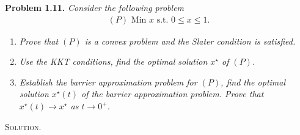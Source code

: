 \documentclass[a4paper]{article}
\numberwithin{equation}{section}
\begin{document}
\textbf{Problem 1.11.} \textit{Consider the following problem}
\begin{align}
\left( P \right) \mbox{ Min } x\mbox{ s.t. } 0 \le x \le 1.
\end{align}
\begin{enumerate}
\item \textit{Prove that  $\left(P\right)$ is a convex problem and the Slater condition is satisfied.}
\item \textit{Use the KKT conditions, find the optimal solution $x^\star$ of $\left(P\right)$.}
\item \textit{Establish the barrier approximation problem for $\left(P\right)$, find the optimal solution $x^\star \left(t\right)$ of the barrier approximation problem. Prove that $x^\star\left(t\right) \to x^\star$ as $t\to 0^+$.}
\end{enumerate}
\textsc{Solution.}
\end{document}
